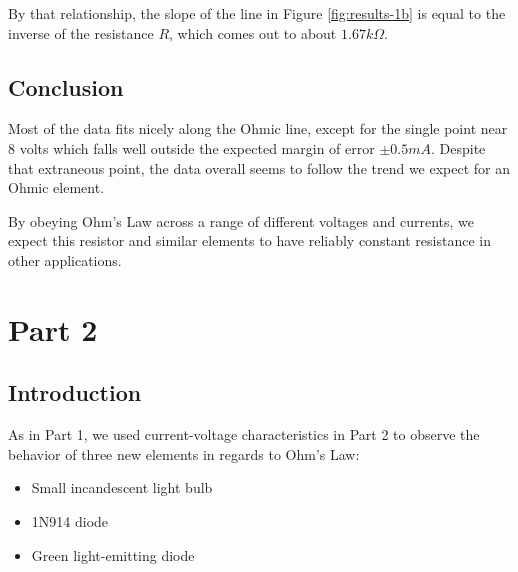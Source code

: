 \documentclass[a4paper, 11pt]{article}
\begin{document}
        By that relationship, the slope of the line in Figure \ref{fig:results-1b} is equal to the inverse of the resistance \( R \), which comes out to about \( 1.67 k\Omega \).
        

    \subsection{Conclusion}




        Most of the data fits nicely along the Ohmic line, except for the single point near 8 volts which falls well outside the expected margin of error \( \pm 0.5 mA \). Despite that extraneous point, the data overall seems to follow the trend we expect for an Ohmic element. \



        By obeying Ohm's Law across a range of different voltages and currents, we expect this resistor and similar elements to have reliably constant resistance in other applications.

\section{Part 2}
    \subsection{Introduction}


        As in Part 1, we used current-voltage characteristics in Part 2 to observe the behavior of three new elements in regards to Ohm's Law: \


        \begin{itemize}
            \item Small incandescent light bulb
            \item 1N914 diode
            \item Green light-emitting diode
        \end{itemize}
\end{document}

